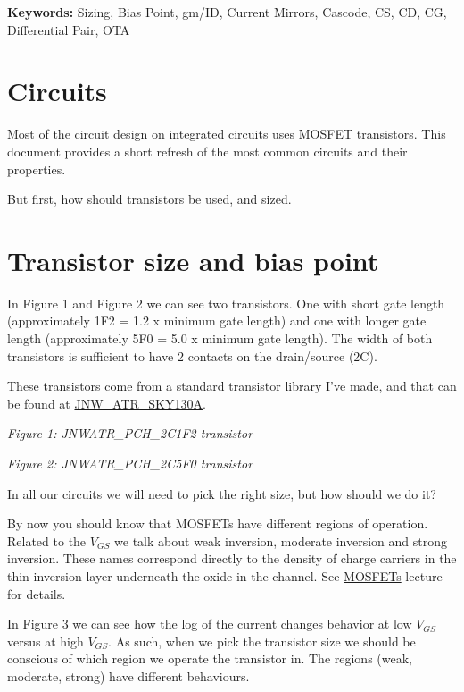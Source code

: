 \textbf{Keywords:} Sizing, Bias Point, gm/ID, Current Mirrors, Cascode,
CS, CD, CG, Differential Pair, OTA

\section{Circuits}\label{circuits}

Most of the circuit design on integrated circuits uses MOSFET
transistors. This document provides a short refresh of the most common
circuits and their properties.

But first, how should transistors be used, and sized.

\section{Transistor size and bias
point}\label{transistor-size-and-bias-point}

In Figure 1 and Figure 2 we can see two transistors. One with short gate
length (approximately 1F2 = 1.2 x minimum gate length) and one with
longer gate length (approximately 5F0 = 5.0 x minimum gate length). The
width of both transistors is sufficient to have 2 contacts on the
drain/source (2C).

These transistors come from a standard transistor library I've made, and
that can be found at
\href{https://analogicus.github.io/jnw_atr_sky130A/}{JNW\_ATR\_SKY130A}.


{
\centering
{}
}

\emph{Figure 1: JNWATR\_PCH\_2C1F2 transistor }


{
\centering
{}
}

\emph{Figure 2: JNWATR\_PCH\_2C5F0 transistor }

In all our circuits we will need to pick the right size, but how should
we do it?

By now you should know that MOSFETs have different regions of operation.
Related to the \(V_{GS}\) we talk about weak inversion, moderate
inversion and strong inversion. These names correspond directly to the
density of charge carriers in the thin inversion layer underneath the
oxide in the channel. See
\href{https://analogicus.com/aic2026/mosfets}{MOSFETs} lecture for
details.

In Figure 3 we can see how the log of the current changes behavior at
low \(V_{GS}\) versus at high \(V_{GS}\). As such, when we pick the
transistor size we should be conscious of which region we operate the
transistor in. The regions (weak, moderate, strong) have different
behaviours.


